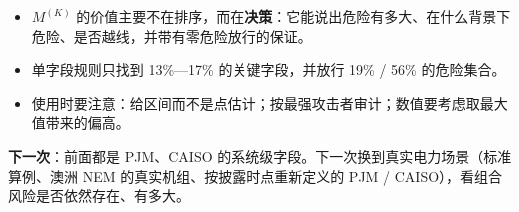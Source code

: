 \documentclass[zihao=-4,a4paper]{ctexart}
\newcommand{\M}{M^{(K)}}
\begin{document}
\begin{keybox}[小结]
\begin{itemize}[leftmargin=*]
  \item $\M$ 的价值主要不在排序，而在\textbf{决策}：它能说出危险有多大、在什么背景下危险、是否越线，并带有零危险放行的保证。
  \item 单字段规则只找到 13\%—17\% 的关键字段，并放行 19\% / 56\% 的危险集合。
  \item 使用时要注意：给区间而不是点估计；按最强攻击者审计；数值要考虑取最大值带来的偏高。
\end{itemize}
\end{keybox}

\textbf{下一次}：前面都是 PJM、CAISO 的系统级字段。下一次换到真实电力场景（标准算例、澳洲 NEM 的真实机组、按披露时点重新定义的 PJM / CAISO），看组合风险是否依然存在、有多大。
\end{document}
